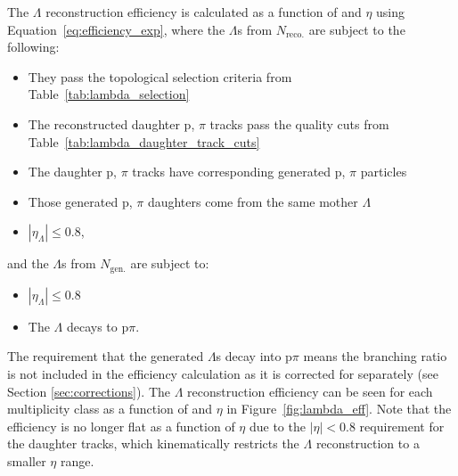  The $\Lambda$ reconstruction efficiency is calculated as a function of \pt and $\eta$ using Equation~\ref{eq:efficiency_exp}, where the $\Lambda$s from $N_{\text{reco.}}$ are subject to the following:
%
\begin{itemize}
	\item They pass the topological selection criteria from Table~\ref{tab:lambda_selection}
	\item The reconstructed daughter p, $\pi$ tracks pass the quality cuts from Table~\ref{tab:lambda_daughter_track_cuts}
	\item The daughter p, $\pi$ tracks have corresponding generated p, $\pi$ particles
	\item Those generated p, $\pi$ daughters come from the same mother $\Lambda$
	\item $|\eta_{\Lambda}| \leq 0.8$,
\end{itemize}
%
and the $\Lambda$s from $N_{\text{gen.}}$ are subject to:
%
\begin{itemize}
	\item $|\eta_{\Lambda}| \leq 0.8$
	\item The $\Lambda$ decays to p$\pi$.
\end{itemize}
%
The requirement that the generated $\Lambda$s decay into p$\pi$ means the branching ratio is not included in the efficiency calculation as it is corrected for separately (see Section \ref{sec:corrections}). The $\Lambda$ reconstruction efficiency can be seen for each multiplicity class as a function of \pt and $\eta$ in Figure~\ref{fig:lambda_eff}. Note that the efficiency is no longer flat as a function of $\eta$ due to the $|\eta| < 0.8$ requirement for the daughter tracks, which kinematically restricts the $\Lambda$ reconstruction to a smaller $\eta$ range.

